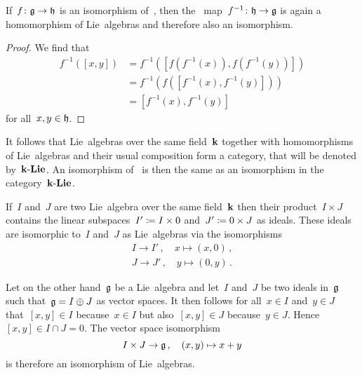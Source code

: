 \begin{lemma}
 If~$f \colon \mathfrak{g} \to \mathfrak{h}$ is an isomorphism of~{\liealgebras{$\kf$}}, then the~{\linear{$\kf$}} map~$f^{-1} \colon \mathfrak{h} \to \mathfrak{g}$ is again a homomorphism of Lie~algebras and therefore also an isomorphism.
\end{lemma}


\begin{proof}
 We find that
 \begin{align*}
  f^{-1}( [x,y] )
  &=
  f^{-1}( [ f(f^{-1}(x)), f(f^{-1}(y)) ] ) \\
  &=
  f^{-1}(f( [f^{-1}(x), f^{-1}(y)] )) \\
  &=
  [f^{-1}(x), f^{-1}(y)]
 \end{align*}
 for all~$x, y \in \mathfrak{h}$.
\end{proof}


\begin{remark}
 It follows that Lie~algebras over the same field~$\kf$ together with homomorphisms of Lie~algebras and their usual composition form a category, that will be denoted by~$\mathbf{k}\text{-}\mathbf{Lie}$.
 An isomorphism of~{\liealgebras{$\kf$}} is then the same as an isomorphism in the category~$\mathbf{k}\text{-}\mathbf{Lie}$.
\end{remark}


\begin{example}
  \label{direct sum of ideals}
  If~$I$ and~$J$ are two Lie~algebra over the same field~$\kf$ then their product~$I \times J$ contains the linear subspaces~$I' \coloneqq I \times 0$ and~$J' \coloneqq 0 \times J$ as ideals.
  These ideals are isomorphic to~$I$ and~$J$ as Lie~algebras via the isomorphisms
  \begin{align*}
    I
    \to
    I'  \,,
    \quad
    x
    \mapsto
    (x,0) \,,
  \\
    J
    \to
    J'  \,,
    \quad
    y
    \mapsto
    (0,y) \,.
  \end{align*}
  
  Let on the other hand~$\mathfrak{g}$ be a Lie~algebra and let~$I$ and~$J$ be two ideals in~$\mathfrak{g}$ such that~$\mathfrak{g} = I \oplus J$ as vector spaces.
  It then follows for all~$x \in I$ and~$y \in J$ that~$[x,y] \in I$ because~$x \in I$ but also~$[x,y] \in J$ because~$y \in J$.
  Hence~$[x,y] \in I \cap J = 0$.
  The vector space isomorphism
  \[
    I \times J
    \to
    \mathfrak{g} \,,
    \quad
    (x,y)
    \mapsto
    x+y
  \]
  is therefore an isomorphism of Lie~algebras.
\end{example}


